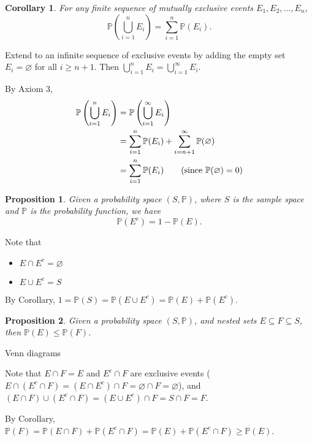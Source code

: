 \documentclass[a4paper,11pt]{amsbook}
\makeatletter
\renewenvironment{proof}[1][\proofname]{\par
    \pushQED{\qed}%
    \normalfont \topsep6\p@\@plus6\p@\relax
    \trivlist
    \itemindent\z@ %
    \item[\hskip\labelsep
          \scshape
      #1\@addpunct{.}]\ignorespaces
}{%
    \popQED\endtrivlist\@endpefalse
}
\newtheorem{proposition}{\hspace{-2em} \color{darkblue} Proposition}[chapter]
\newtheorem{corollary}{\hspace{-2em} \color{darkblue} Corollary}[chapter]
\theoremstyle{definition}
\theoremstyle{remark}
\renewcommand{\P}{\mathbb{P}}
\newcommand\inc\subseteq
\newcommand\0{\varnothing}
\makeatother
\begin{document}
    \begin{corollary} \label{1.1}
        For any finite sequence of mutually exclusive events $E_1,E_2,\ldots,E_n$, $$\P\left(\bigcup_{i=1}^n E_i\right)=\sum_{i=1}^n\P(E_i).$$
    \end{corollary}
    \begin{proof}
        Extend to an infinite sequence of exclusive events by adding  the empty set $E_i=\varnothing$ for all $i\geq n+1$.
        Then $\bigcup_{i=1}^n E_i=\bigcup_{i=1}^\infty E_i$.

        By Axiom 3, \begin{align*}
            \P\left(\bigcup_{i=1}^n E_i\right)&=\P\left( \bigcup_{i=1}^\infty E_i \right) \\
            &=\sum_{i=1}^n\P(E_i)+\sum_{i=n+1}^\infty\P(\varnothing) \\
            &=\sum_{i=1}^n\P(E_i) \tag{since $\P(\varnothing)=0$}
        \end{align*}
    \end{proof}

    \begin{proposition}
        Given a probability space $(S,\P)$, where $S$ is the \emph{sample space} and $\P$ is the \emph{probability function},
        we have $$\P(E^c)=1-\P(E).$$
    \end{proposition}
    \begin{proof}
        Note that \begin{itemize}
            \item $E\cap E^c=\varnothing$
            \item $E\cup E^c=S$
        \end{itemize}

        By Corollary, $1=\P(S)=\P(E\cup E^c)=\P(E)+\P(E^c)$. %
    \end{proof}

    \begin{proposition}
        Given a probability space $(S,\P)$, and nested sets $E\inc F\inc S$, then $\P(E)\leq\P(F)$.
    \end{proposition}
    \begin{proof}
        Venn diagrams
        \begin{center}
        \end{center}

        Note that $E\cap F=E$ and $E^c\cap F$ are exclusive events ($E\cap(E^c\cap F)=(E\cap E^c)\cap F=\varnothing\cap F=\varnothing$),
        and $(E\cap F)\cup(E^c\cap F)=(E\cup E^c)\cap F=S\cap F=F$.

        By Corollary, $\P(F)=\P(E\cap F)+\P(E^c\cap F)=\P(E)+\P(E^c\cap F)\geq\P(E)$.
    \end{proof}
\end{document}

